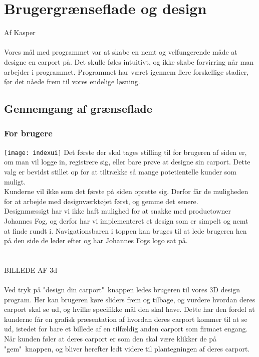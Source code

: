 \section{Brugergrænseflade og design}
Af Kasper\\\\
Vores mål med programmet var at skabe en nemt og velfungerende måde at designe en carport på.
Det skulle føles intuitivt, og ikke skabe forvirring når man arbejder i programmet.
Programmet har været igennem flere forskellige stadier, før det nåede frem til vores endelige løsning.
\\
\subsection{Gennemgang af grænseflade}
\subsubsection{For brugere}
\texttt{[image: indexui]}
Det første der skal tages stilling til for brugeren af siden er, om man vil logge in, registrere sig, eller bare prøve at designe sin carport.
Dette valg er bevidst stillet op for at tiltrække så mange potetientelle kunder som muligt.\\
Kunderne vil ikke som det første på siden oprette sig. Derfor får de muligheden for at arbejde med designværktøjet først, og gemme det senere.\\
Designmæssigt har vi ikke haft mulighed for at snakke med productowner Johannes Fog, og derfor har vi implementeret et design som er simpelt og nemt at finde rundt i.
Navigationsbaren i toppen kan bruges til at lede brugeren hen på den side de leder efter og har Johannes Fogs logo sat på.\\
\\\\
BILLEDE AF 3d
\\\\
Ved tryk på "design din carport"\ knappen ledes brugeren til vores 3D design program. Her kan brugeren køre sliders frem og tilbage, og vurdere hvordan deres carport skal se ud, og hvilke specifikke mål den skal have. Dette har den fordel at kunderne får en grafisk præsentation af hvordan deres carport kommer til at se ud, istedet for bare et billede af en tilfældig anden carport som firmaet engang. Når kunden føler at deres carport er som den skal være klikker de på "gem"\ knappen, og bliver herefter ledt videre til plantegningen af deres carport.
\\\\

